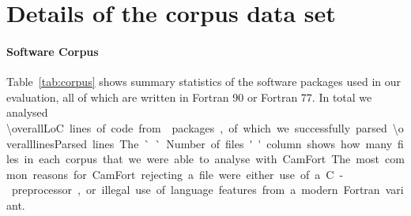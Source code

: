 
\section{Details of the corpus data set}
\label{app:corpus}

\paragraph{Software Corpus}
Table~\ref{tab:corpus} shows summary statistics of the software
packages used in our evaluation, all of which are written in Fortran
90 or Fortran 77. In total we analysed \SI{\overallLoC} lines of code
from \numPackages{} packages, of which we successfully parsed
\SI{\overalllinesParsed} lines. The ``Number of files'' column shows
how many files in each corpus that we were able to analyse with
CamFort. The most common reasons for CamFort rejecting a file were
either use of a C-preprocessor, or illegal use of language features
from a modern Fortran variant.

